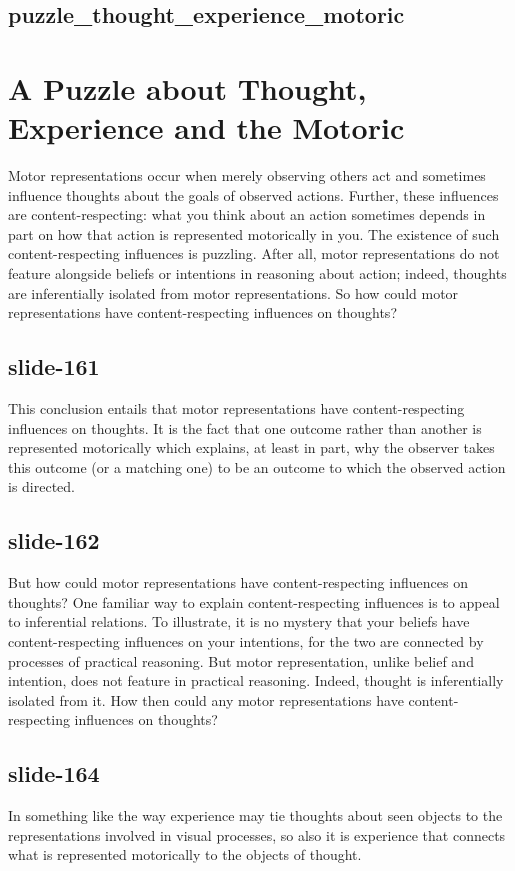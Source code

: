 \documentclass[12pt,\papersize]{extarticle}
\begin{document}
\subsection{puzzle\_thought\_experience\_motoric}


\section{A Puzzle about Thought, Experience and the Motoric}

Motor representations occur when merely observing others act and sometimes influence thoughts about the
goals of observed actions. Further, these influences are content-respecting: what you think about an
action sometimes depends in part on how that action is represented motorically in you. The existence of
such content-respecting influences is puzzling. After all, motor representations do not feature
alongside beliefs or intentions in reasoning about action; indeed, thoughts are inferentially isolated
from motor representations. So how could motor representations have content-respecting influences on
thoughts?

\subsection{slide-161}
This conclusion entails that motor representations have content-respecting
influences on thoughts. It is the fact that one outcome rather than another is represented
motorically which explains, at least in part, why the observer takes this outcome (or a matching
one) to be an outcome to which the observed action is directed.

\subsection{slide-162}
But how could motor representations
have content-respecting influences on thoughts? One familiar way to explain content-respecting
influences is to appeal to inferential relations. To illustrate, it is no mystery that your beliefs
have content-respecting influences on your intentions, for the two are connected by processes of
practical reasoning. But motor representation, unlike belief and intention, does not feature in
practical reasoning. Indeed, thought is inferentially isolated from it. How then could any motor
representations have content-respecting influences on thoughts?

\subsection{slide-164}
In something like the way experience may tie thoughts about seen objects to the representations
involved in visual processes, so also it is experience that connects what is represented
motorically to the objects of thought.
\end{document}

